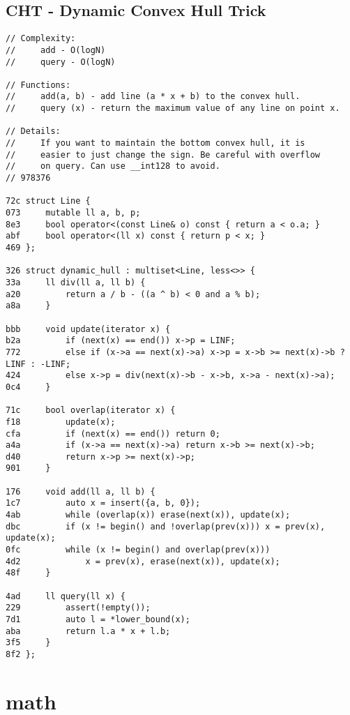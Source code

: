 \documentclass[11pt, a4paper, twoside]{article}
\begin{document}
\subsection{CHT - Dynamic Convex Hull Trick}
\begin{lstlisting}
// Complexity: 
//     add - O(logN)
//     query - O(logN)

// Functions:
//     add(a, b) - add line (a * x + b) to the convex hull.
//     query (x) - return the maximum value of any line on point x.

// Details:
//     If you want to maintain the bottom convex hull, it is
//     easier to just change the sign. Be careful with overflow
//     on query. Can use __int128 to avoid.
// 978376

72c struct Line {
073     mutable ll a, b, p;
8e3     bool operator<(const Line& o) const { return a < o.a; }
abf     bool operator<(ll x) const { return p < x; }
469 };

326 struct dynamic_hull : multiset<Line, less<>> {
33a     ll div(ll a, ll b) { 
a20         return a / b - ((a ^ b) < 0 and a % b);
a8a     }
        
bbb     void update(iterator x) {
b2a         if (next(x) == end()) x->p = LINF;
772         else if (x->a == next(x)->a) x->p = x->b >= next(x)->b ? LINF : -LINF;
424         else x->p = div(next(x)->b - x->b, x->a - next(x)->a);
0c4     }
    
71c     bool overlap(iterator x) {
f18         update(x);
cfa         if (next(x) == end()) return 0;
a4a         if (x->a == next(x)->a) return x->b >= next(x)->b;
d40         return x->p >= next(x)->p;
901     }
            
176     void add(ll a, ll b) {
1c7         auto x = insert({a, b, 0});
4ab         while (overlap(x)) erase(next(x)), update(x);
dbc         if (x != begin() and !overlap(prev(x))) x = prev(x), update(x);
0fc         while (x != begin() and overlap(prev(x))) 
4d2             x = prev(x), erase(next(x)), update(x);
48f     }
        
4ad     ll query(ll x) {
229         assert(!empty());
7d1         auto l = *lower_bound(x);
aba         return l.a * x + l.b;
3f5     }
8f2 };
\end{lstlisting}



%
%

\section{math}
\end{document}
